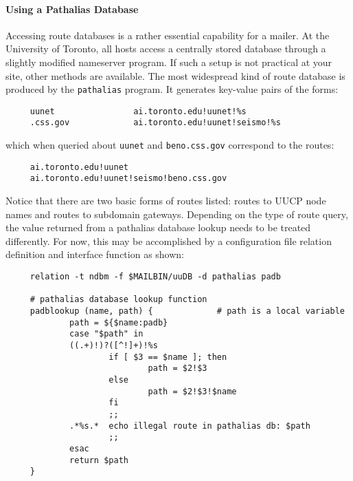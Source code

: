\paragraph{Using a Pathalias Database}





Accessing route databases is a rather essential capability for a mailer.
At the University of Toronto, all hosts access a centrally stored database
through a slightly modified nameserver program.  If such a setup is not
practical at your site, other methods are available.  The most widespread
kind of route database is produced by the {\tt pathalias} program.  It
generates key-value pairs of the forms:

\begin{tscreen}
\begin{verbatim}
     uunet                ai.toronto.edu!uunet!%s
     .css.gov             ai.toronto.edu!uunet!seismo!%s
\end{verbatim}
\end{tscreen}


which when queried about {\tt uunet} and {\tt beno.css.gov} correspond to 
the routes:

\begin{tscreen}
\begin{verbatim}
     ai.toronto.edu!uunet
     ai.toronto.edu!uunet!seismo!beno.css.gov
\end{verbatim}
\end{tscreen}


Notice that there are two basic forms of routes listed: routes to UUCP node
names and routes to subdomain gateways.  Depending on the type of route
query, the value returned from a pathalias database lookup needs to be
treated differently.  For now, this may be accomplished by a configuration
file relation definition and interface function as shown:

\begin{tscreen}
\begin{verbatim}
     relation -t ndbm -f $MAILBIN/uuDB -d pathalias padb
     
     # pathalias database lookup function
     padblookup (name, path) {             # path is a local variable
             path = ${$name:padb}
             case "$path" in
             ((.+)!)?([^!]+)!%s
                     if [ $3 == $name ]; then
                             path = $2!$3
                     else
                             path = $2!$3!$name
                     fi
                     ;;
             .*%s.*  echo illegal route in pathalias db: $path
                     ;;
             esac
             return $path
     }
\end{verbatim}
\end{tscreen}


